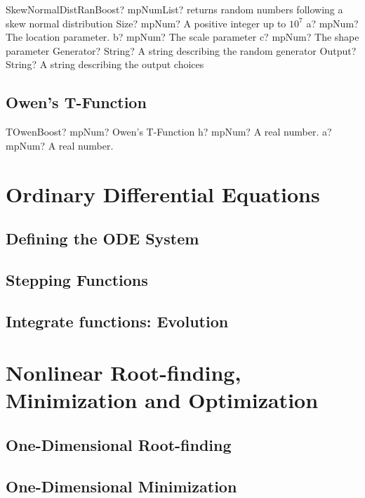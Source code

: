 \documentclass[12pt,a4paper,openany]{book}
\begin{document}
\begin{mpFunctionsExtract}
\mpFunctionSix
{SkewNormalDistRanBoost? mpNumList? returns random numbers following a skew normal distribution}
{Size? mpNum? A positive integer up to $10^7$}
{a? mpNum? The location parameter.}
{b? mpNum? The scale parameter}
{c? mpNum? The shape parameter}
{Generator? String? A string describing the random generator}
{Output? String? A string describing the output choices}
\end{mpFunctionsExtract}

\section{Owen's T-Function}

\begin{mpFunctionsExtract}
\mpFunctionTwo
{TOwenBoost? mpNum? Owen's T-Function}
{h? mpNum? A real number.}
{a? mpNum? A real number.}
\end{mpFunctionsExtract}

\chapter{Ordinary Differential Equations}

\section{Defining the ODE System}

\section{Stepping Functions}

\section{Integrate functions: Evolution}

\chapter{Nonlinear Root-finding, Minimization and Optimization}

\section{One-Dimensional Root-finding}

\section{One-Dimensional Minimization}
\end{document}
